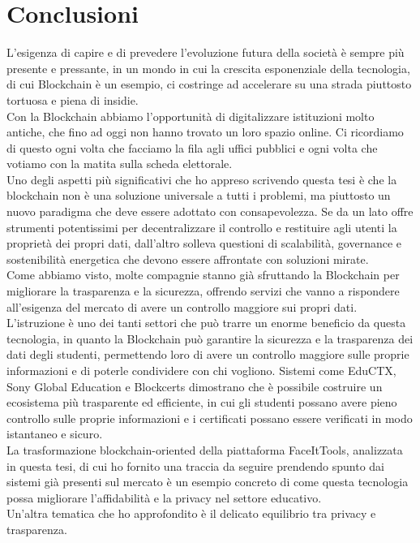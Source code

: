\chapter{Conclusioni}
L'esigenza di capire e di prevedere l'evoluzione futura della società è sempre più presente e pressante,
in un mondo in cui la crescita esponenziale della tecnologia, di cui Blockchain è un esempio, ci costringe ad accelerare su una strada piuttosto tortuosa e piena di insidie.
\\Con la Blockchain abbiamo l'opportunità di digitalizzare istituzioni molto antiche, che fino ad oggi non hanno trovato un loro spazio online.
Ci ricordiamo di questo ogni volta che facciamo la fila agli uffici pubblici e ogni volta che votiamo con la matita sulla scheda elettorale.
\\Uno degli aspetti più significativi che ho appreso scrivendo questa tesi è che la blockchain non è una soluzione universale a tutti i problemi, ma piuttosto un nuovo paradigma che deve essere adottato con consapevolezza. 
Se da un lato offre strumenti potentissimi per decentralizzare il controllo e restituire agli utenti la proprietà dei propri dati, dall’altro solleva questioni di scalabilità, governance e sostenibilità energetica che devono essere affrontate con soluzioni mirate.
\\Come abbiamo visto, molte compagnie stanno già sfruttando la Blockchain per migliorare la trasparenza e la sicurezza, offrendo servizi che vanno a rispondere all'esigenza del mercato di avere un controllo maggiore sui propri dati.
\\L'istruzione è uno dei tanti settori che può trarre un enorme beneficio da questa tecnologia, in quanto la Blockchain può garantire la sicurezza e la trasparenza dei dati degli studenti, permettendo loro di avere un controllo maggiore sulle proprie informazioni e di poterle condividere con chi vogliono.
Sistemi come EduCTX, Sony Global Education e Blockcerts dimostrano che è possibile costruire un ecosistema più trasparente ed efficiente, in cui gli studenti possano avere pieno controllo sulle proprie informazioni e i certificati possano essere verificati in modo istantaneo e sicuro. 
\\La trasformazione blockchain-oriented della piattaforma FaceItTools, analizzata in questa tesi, di cui ho fornito una traccia da seguire prendendo spunto dai sistemi già presenti sul mercato è un esempio concreto di come questa tecnologia possa migliorare l’affidabilità e la privacy nel settore educativo.
\\Un'altra tematica che ho approfondito è il delicato equilibrio tra privacy e trasparenza. 
